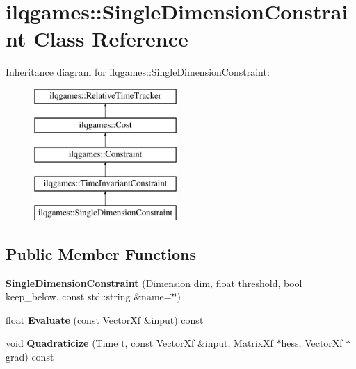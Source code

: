 \hypertarget{classilqgames_1_1_single_dimension_constraint}{}\section{ilqgames\+:\+:Single\+Dimension\+Constraint Class Reference}
\label{classilqgames_1_1_single_dimension_constraint}
Inheritance diagram for ilqgames\+:\+:Single\+Dimension\+Constraint\+:\begin{figure}[H]
\begin{center}
\leavevmode
\includegraphics[height=5.000000cm]{classilqgames_1_1_single_dimension_constraint}
\end{center}
\end{figure}
\subsection*{Public Member Functions}
\begin{DoxyCompactItemize}
\item 
{\bfseries Single\+Dimension\+Constraint} (Dimension dim, float threshold, bool keep\+\_\+below, const std\+::string \&name=\char`\"{}\char`\"{})\hypertarget{classilqgames_1_1_single_dimension_constraint_ac60e4186efa65c01cd1f236998570b33}{}\label{classilqgames_1_1_single_dimension_constraint_ac60e4186efa65c01cd1f236998570b33}

\item 
float {\bfseries Evaluate} (const Vector\+Xf \&input) const \hypertarget{classilqgames_1_1_single_dimension_constraint_a06e86b07723e497b1e8d1f971b45435f}{}\label{classilqgames_1_1_single_dimension_constraint_a06e86b07723e497b1e8d1f971b45435f}

\item 
void {\bfseries Quadraticize} (Time t, const Vector\+Xf \&input, Matrix\+Xf $\ast$hess, Vector\+Xf $\ast$grad) const \hypertarget{classilqgames_1_1_single_dimension_constraint_a3f2bd8d4267081b1bab2539601fb1c47}{}\label{classilqgames_1_1_single_dimension_constraint_a3f2bd8d4267081b1bab2539601fb1c47}

\end{DoxyCompactItemize}
